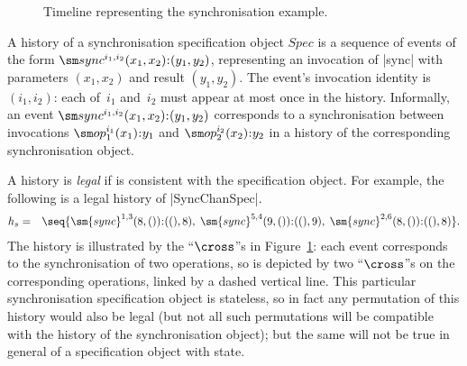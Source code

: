 
\begin{figure}
\unScalaMid
\begin{center}
\end{center}
\caption{Timeline representing the synchronisation example.}
\label{fig:sync-timeline}
\scalaMid
\end{figure}


A history of a synchronisation specification object $Spec$ is a sequence of
events of the form $\sync^{i_1, i_2}(x_1, x_2)\:: (y_1, y_2)$, representing an
invocation of |sync| with parameters $(x_1, x_2)$ and result $(y_1,y_2)$.  The
event's invocation identity is~$(i_1,i_2)$: each of~$i_1$ and~$i_2$ must
appear at most once in the history.  Informally, an event $\sync^{i_1,
  i_2}(x_1, x_2)\:: (y_1, y_2)$ corresponds to a synchronisation between
invocations $\op_1^{i_1}(x_1)\::y_1$ and $\op_2^{i_2}(x_2)\::y_2$ in a history
of the corresponding synchronisation object.

A history is \emph{legal} if is consistent with the specification object.  
%
For example, the following is a legal history of |SyncChanSpec|.
\begin{eqnarray*}
h_s & = & 
\seq{
 \sm{sync}^{1,3}(8,()) \:: ((), 8), \;
 \sm{sync}^{5,4}(9,()) \:: ((), 9), \;
 \sm{sync}^{2,6}(8,()) \:: ((), 8) } .
\end{eqnarray*}
The history is illustrated by the ``$\cross$''s in
Figure~\ref{fig:sync-timeline}: each event corresponds to the synchronisation
of two operations, so is depicted by two ``$\cross$''s on the corresponding
operations, linked by a dashed vertical line.  This particular synchronisation
specification object is stateless, so in fact any permutation of this history
would also be legal (but not all such permutations will be compatible with the
history of the synchronisation object); but the same will not be true in
general of a specification object with state.

